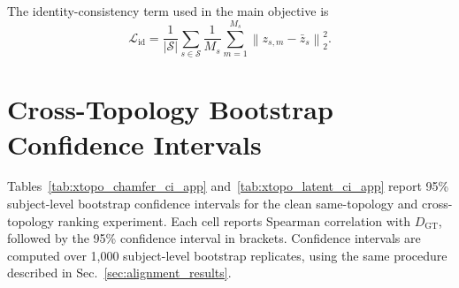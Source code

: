 \documentclass{article}
\begin{document}
The identity-consistency term used in the main objective is
\begin{equation}
\mathcal L_{\mathrm{id}}
=
\frac{1}{|\mathcal S|}
\sum_{s\in\mathcal S}
\frac{1}{M_s}
\sum_{m=1}^{M_s}
\left\|
z_{s,m}-\bar z_s
\right\|_2^2 .
\end{equation}

\section{Cross-Topology Bootstrap Confidence Intervals}
\label{app:xtopo_bootstrap_ci}

Tables~\ref{tab:xtopo_chamfer_ci_app} and~\ref{tab:xtopo_latent_ci_app}
report 95\% subject-level bootstrap confidence intervals for the clean
same-topology and cross-topology ranking experiment. Each cell reports Spearman
correlation with $D_{\mathrm{GT}}$, followed by the 95\% confidence interval in
brackets. Confidence intervals are computed over 1,000 subject-level bootstrap
replicates, using the same procedure described in Sec.~\ref{sec:alignment_results}.

\begin{table}[!htbp]
\centering
\scriptsize
\caption{
Raw Chamfer clean same-topology and cross-topology Spearman correlation with
95\% subject-level bootstrap confidence intervals. Rows indicate source topology
and columns indicate target topology.
}
\label{tab:xtopo_chamfer_ci_app}
\setlength{\tabcolsep}{2.0pt}
\renewcommand{\arraystretch}{1.08}
\end{table}
\end{document}
